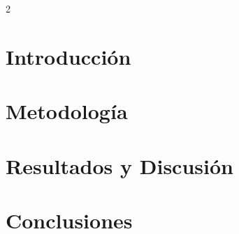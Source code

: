 \documentclass{article}
\begin{document}



\begin{multicols}{2}
\section*{Introducción}


\section*{Metodolog\'ia}


\section*{Resultados y Discusi\'on}


\section*{Conclusiones}



\end{multicols}
\end{document}
